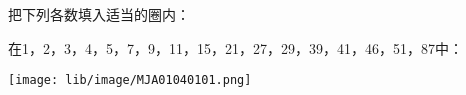 把下列各数填入适当的圈内：

在1，2，3，4，5，7，9，11，15，21，27，29，39，41，46，51，87中：

\texttt{[image: lib/image/MJA01040101.png]}